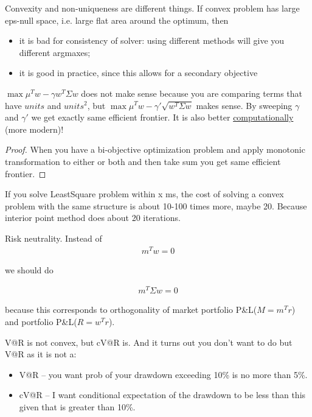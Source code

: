 \newcommand{\pnl}{P\&L}

\begin{idea}
	Convexity and non-uniqueness are different things. If convex problem has large eps-null space, i.e. large flat area around the optimum, then
	\begin{itemize}
		\item it is bad for consistency of solver: using different methods will give you different argmaxes;
		\item it is good in practice, since this allows for a secondary objective
	\end{itemize}
\end{idea}

\begin{idea}
	$\max \mu^T w - \gamma w^T \Sigma w $ does not make sense because you are comparing terms that have $units$ and $units^2$, but $\max \mu^T w - \gamma' \sqrt{w^T \Sigma w}$ makes sense. By sweeping $\gamma$ and $\gamma'$ we get exactly same efficient frontier. It is also better \underline{computationally} (more modern)!
	\begin{proof}
		When you have a bi-objective optimization problem and apply monotonic transformation to either or both and then take sum you get same efficient frontier.
	\end{proof}
\end{idea}

\begin{idea}
	If you solve LeastSquare problem within x ms, the cost of solving a convex problem with the same structure is about 10-100 times more, maybe 20. Because interior point method does about 20 iterations.
\end{idea}

\begin{idea}
	Risk neutrality. Instead of 
	\begin{align}
		m^T w = 0
	\end{align}

	we should do
	
	\begin{align}
		m^T \Sigma w = 0
	\end{align}

	because this corresponds to orthogonality of market portfolio \pnl  ($M = m^T r$) and portfolio \pnl ($R = w^T r$).
	
\end{idea}

\begin{idea}
	\textrm{V@R} is not convex, but \textrm{cV@R} is. And it turns out you don't want to do but \textrm{V@R} as it is not a:
	\begin{itemize}
		\item \textrm{V@R} -- you want prob of your drawdown exceeding 10\% is no more than 5\%.
		\item \textrm{cV@R} -- I want conditional expectation of the drawdown to be less than this given that is greater than 10\%. 
	\end{itemize}
\end{idea}

